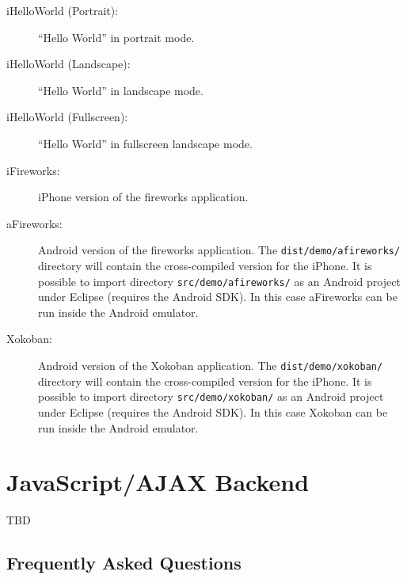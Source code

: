 \documentclass[11pt]{book}
\begin{document}
\begin{description}

\item[iHelloWorld (Portrait):] ``Hello World'' in portrait mode.
\item[iHelloWorld (Landscape):] ``Hello World'' in landscape mode.
\item[iHelloWorld (Fullscreen):] ``Hello World'' in fullscreen
  landscape mode.
\item[iFireworks:] iPhone version of the fireworks application.
\item[aFireworks:] Android version of the fireworks application. The
  \texttt{dist/demo/afireworks/} directory will contain the cross-compiled
  version for the iPhone. It is possible to import directory
  \texttt{src/demo/afireworks/} as an Android project under Eclipse (requires
  the Android SDK). In this case aFireworks can be run inside the
  Android emulator.
\item[Xokoban:] Android version of the Xokoban application. The
  \texttt{dist/demo/xokoban/} directory will contain the
  cross-compiled version for the iPhone. It is possible to import
  directory \texttt{src/demo/xokoban/} as an Android project under
  Eclipse (requires the Android SDK). In this case Xokoban can be run
  inside the Android emulator.
\end{description}


\chapter{JavaScript/AJAX Backend}

TBD


\begin{appendix}
\chapter{Frequently Asked Questions}

\end{appendix}



\end{document}
